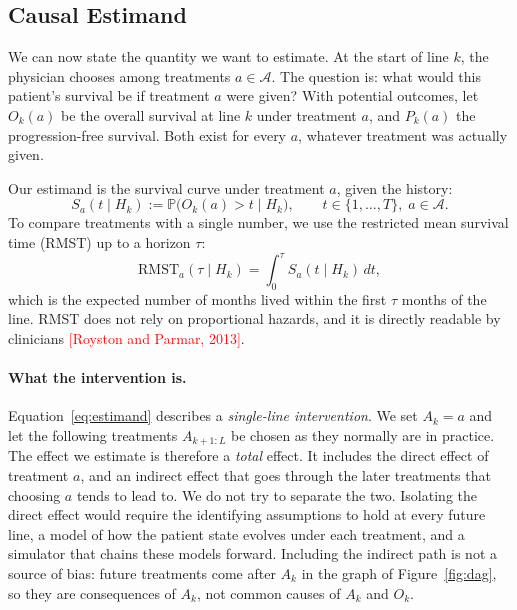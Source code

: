 \documentclass[a4paper,10pt]{article}
\newcommand{\todo}[1]{\textcolor{red}{#1}}
\begin{document}
\subsection{Causal Estimand}
\label{sec:estimand}

We can now state the quantity we want to estimate. At the start of line $k$, the physician chooses among treatments $a \in \mathcal{A}$. The question is: what would this patient's survival be if treatment $a$ were given? With potential outcomes, let $O_k(a)$ be the overall survival at line $k$ under treatment $a$, and $P_k(a)$ the progression-free survival. Both exist for every $a$, whatever treatment was actually given.

Our estimand is the survival curve under treatment $a$, given the history:
\begin{equation}
    S_a(t \mid H_k) := \mathbb{P}\big(O_k(a) > t \mid H_k\big), \qquad t \in \{1, \ldots, T\},\; a \in \mathcal{A}.
    \label{eq:estimand}
\end{equation}
To compare treatments with a single number, we use the restricted mean survival time (RMST) up to a horizon $\tau$:
\begin{equation}
    \text{RMST}_a(\tau \mid H_k) = \int_{0}^{\tau} S_a(t \mid H_k)\, dt,
\end{equation}
which is the expected number of months lived within the first $\tau$ months of the line. RMST does not rely on proportional hazards, and it is directly readable by clinicians \todo{[Royston and Parmar, 2013]}.

\paragraph{What the intervention is.}
Equation~\eqref{eq:estimand} describes a \emph{single-line intervention}. We set $A_k = a$ and let the following treatments $A_{k+1:L}$ be chosen as they normally are in practice. The effect we estimate is therefore a \emph{total} effect. It includes the direct effect of treatment $a$, and an indirect effect that goes through the later treatments that choosing $a$ tends to lead to. We do not try to separate the two. Isolating the direct effect would require the identifying assumptions to hold at every future line, a model of how the patient state evolves under each treatment, and a simulator that chains these models forward. Including the indirect path is not a source of bias: future treatments come after $A_k$ in the graph of Figure~\ref{fig:dag}, so they are consequences of $A_k$, not common causes of $A_k$ and $O_k$.
\end{document}
